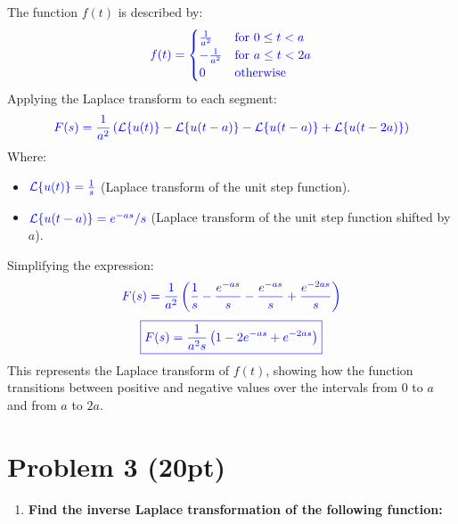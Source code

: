 \documentclass{article}
\begin{document}
\begin{center}
\end{center}
The function \( f(t) \) is described by:
\[
	\textcolor{blue}{f(t) = \begin{cases} 
		\frac{1}{a^2} & \text{for } 0 \leq t < a \\
		-\frac{1}{a^2} & \text{for } a \leq t < 2a \\
		0 & \text{otherwise}
		\end{cases}}
\]
Applying the Laplace transform to each segment:
\[
	\textcolor{blue}{F(s) = \frac{1}{a^2} \left( \mathcal{L}\{u(t)\} - \mathcal{L}\{u(t-a)\} - \mathcal{L}\{u(t-a)\} + \mathcal{L}\{u(t-2a)\} \right)}
\]
Where:
\begin{itemize}
	\item \(\textcolor{blue}{\mathcal{L}\{u(t)\} = \frac{1}{s}}\) (Laplace transform of the unit step function).
	\item \(\textcolor{blue}{\mathcal{L}\{u(t-a)\} = e^{-as}/s}\) (Laplace transform of the unit step function shifted by \( a \)).
\end{itemize}
Simplifying the expression:
\[
	\textcolor{blue}{F(s) = \frac{1}{a^2} \left( \frac{1}{s} - \frac{e^{-as}}{s} - \frac{e^{-as}}{s} + \frac{e^{-2as}}{s} \right)}
\]
\[
	\textcolor{blue}{\boxed{F(s) = \frac{1}{a^2 s} \left( 1 - 2e^{-as} + e^{-2as} \right)}}
\]
This represents the Laplace transform of \( f(t) \), showing how the function transitions between positive and negative values over the intervals from 0 to \( a \) and from \( a \) to \( 2a \).


\newpage
\section*{Problem 3 (20pt)}
\begin{enumerate}
	\item[(a)] \textbf{Find the inverse Laplace transformation of the following function:}
\end{enumerate}
\end{document}
